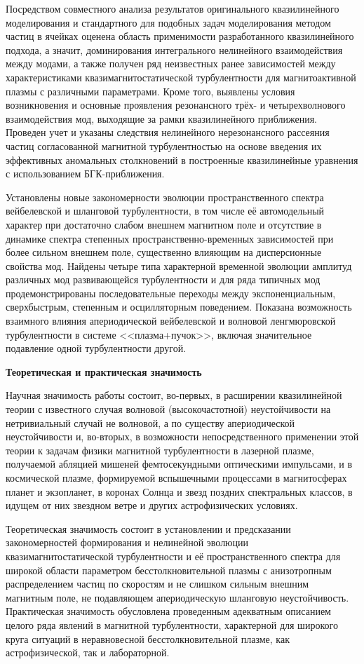 Посредством совместного анализа результатов оригинального квазилинейного моделирования и стандартного для подобных задач моделирования методом частиц в ячейках оценена область применимости разработанного квазилинейного подхода, а значит, доминирования интегрального нелинейного взаимодействия между модами, а также получен ряд неизвестных ранее зависимостей между характеристиками квазимагнитостатической турбулентности для магнитоактивной плазмы с различными параметрами. Кроме того, выявлены условия возникновения и основные проявления резонансного трёх- и четырехволнового взаимодействия мод, выходящие за рамки квазилинейного приближения. Проведен учет и указаны следствия нелинейного нерезонансного рассеяния частиц согласованной магнитной турбулентностью на основе введения их эффективных аномальных столкновений в построенные квазилинейные уравнения с использованием БГК-приближения.

Установлены новые закономерности эволюции пространственного спектра вейбелевской и шланговой турбулентности, в том числе её автомодельный характер при достаточно слабом внешнем магнитном поле и отсутствие в динамике спектра степенных пространственно-временных зависимостей при более сильном внешнем поле, существенно влияющим на дисперсионные свойства мод. Найдены четыре типа характерной временной эволюции амплитуд различных мод развивающейся турбулентности и для ряда типичных мод продемонстрированы последовательные переходы между экспоненциальным, сверхбыстрым, степенным и осцилляторным поведением. Показана возможность взаимного влияния апериодической вейбелевской и волновой ленгмюровской турбулентности в системе <<плазма+пучок>>, включая значительное подавление одной турбулентности другой.  

{\bfseries Теоретическая и практическая значимость}

Научная значимость работы состоит, во-первых, в расширении квазилинейной теории с известного случая волновой (высокочастотной) неустойчивости на нетривиальный случай не волновой, а по существу апериодической неустойчивости и, во-вторых, в возможности непосредственного применении этой теории к задачам физики магнитной турбулентности в лазерной плазме, получаемой абляцией мишеней фемтосекундными оптическими импульсами, и в космической плазме, формируемой вспышечными процессами в магнитосферах планет и экзопланет, в коронах Солнца и звезд поздних спектральных классов, в идущем от них звездном ветре и других астрофизических условиях. 

Теоретическая значимость состоит в установлении и предсказании закономерностей формирования и нелинейной эволюции квазимагнитостатической турбулентности и её пространственного спектра для широкой области параметром бесстолкновительной плазмы с анизотропным распределением частиц по скоростям и не слишком сильным внешним магнитным поле, не подавляющем апериодическую шланговую неустойчивость. Практическая значимость обусловлена проведенным адекватным описанием целого ряда явлений в магнитной турбулентности, характерной для широкого круга ситуаций в неравновесной бесстолкновительной плазме, как астрофизической, так и лабораторной.

